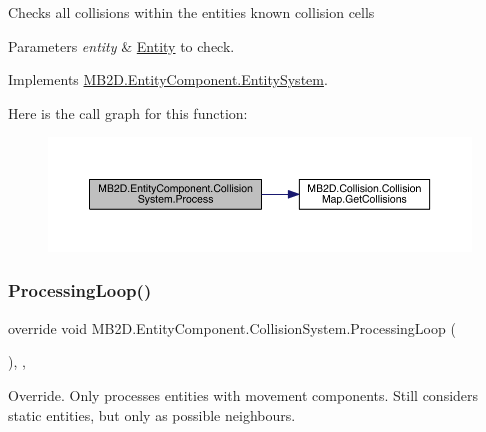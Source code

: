 Checks all collisions within the entities known collision cells 


\begin{DoxyParams}{Parameters}
{\em entity} & \hyperlink{class_m_b2_d_1_1_entity_component_1_1_entity}{Entity} to check.\\
\hline
\end{DoxyParams}


Implements \hyperlink{class_m_b2_d_1_1_entity_component_1_1_entity_system_abbf83b87cb5d12754fb058cef50451fa}{M\+B2\+D.\+Entity\+Component.\+Entity\+System}.

Here is the call graph for this function\+:
\nopagebreak
\begin{figure}[H]
\begin{center}
\leavevmode
\includegraphics[width=350pt]{class_m_b2_d_1_1_entity_component_1_1_collision_system_adfbee070ed7b120565a5f8a08c159535_cgraph}
\end{center}
\end{figure}
\hypertarget{class_m_b2_d_1_1_entity_component_1_1_collision_system_a06249adc606475cdc35f28783a1b27c4}{}\label{class_m_b2_d_1_1_entity_component_1_1_collision_system_a06249adc606475cdc35f28783a1b27c4} 
\subsubsection{\texorpdfstring{Processing\+Loop()}{ProcessingLoop()}}
{\footnotesize\ttfamily override void M\+B2\+D.\+Entity\+Component.\+Collision\+System.\+Processing\+Loop (\begin{DoxyParamCaption}{ }\end{DoxyParamCaption})\hspace{0.3cm}{\ttfamily [inline]}, {\ttfamily [protected]}, {\ttfamily [virtual]}}



Override. Only processes entities with movement components. Still considers static entities, but only as possible neighbours. 



